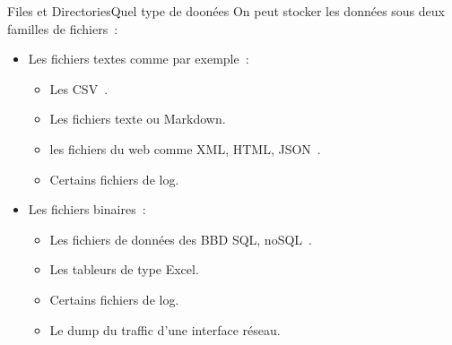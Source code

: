 \documentclass{beamer}
\begin{document}
    \begin{frame}[fragile]{Files et Directories}{Quel type de doonées}
        On peut stocker les données sous deux familles de fichiers~:
        \begin{itemize}
            \item Les fichiers textes comme par exemple~:
            \begin{itemize}
                \item Les CSV~.
                \item Les fichiers texte ou Markdown.
                \item les fichiers du web comme XML, HTML, JSON~.
                \item Certains fichiers de log.
            \end{itemize}
            \item Les fichiers binaires~:
            \begin{itemize}
                \item Les fichiers de données des BBD SQL, noSQL~.
                \item Les tableurs de type Excel.
                \item Certains fichiers de log.
                \item Le dump du traffic d'une interface réseau.
            \end{itemize}
        \end{itemize}
    \end{frame}
\end{document}

